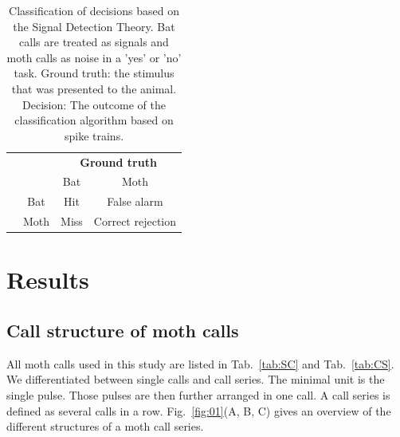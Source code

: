 \documentclass[12pt,a4paper,pdftex]{article}
\begin{document}
\begin{table}[h]
	\centering
	\caption{Classification of decisions based on the Signal Detection Theory. Bat calls are treated as signals and moth calls as noise in a 'yes' or 'no' task. Ground truth: the stimulus that was presented to the animal. Decision: The outcome of the classification algorithm based on spike trains.}
	\setlength{\tabcolsep}{10pt} %
	\renewcommand{\arraystretch}{1.5} %
	\label{tab:yesno}
	\begin{tabular}{llcc}
		&                                                   & \multicolumn{2}{c}{\cellcolor[HTML]{C0C0C0}\textbf{Ground truth}} \\
		&                                                   & \cellcolor[HTML]{C0C0C0}Bat     & \cellcolor[HTML]{C0C0C0}Moth    \\ \cline{3-4} 
		\multicolumn{1}{c}{\cellcolor[HTML]{C0C0C0}{\color[HTML]{000000} }}                                    & \multicolumn{1}{c|}{\cellcolor[HTML]{C0C0C0}Bat}  & Hit                             & False alarm                     \\
		\multicolumn{1}{c}{\multirow{-2}{*}{\cellcolor[HTML]{C0C0C0}{\color[HTML]{000000} \textbf{Decision}}}} & \multicolumn{1}{c|}{\cellcolor[HTML]{C0C0C0}Moth} & Miss                            & Correct rejection              
	\end{tabular}
\end{table}
\FloatBarrier

\newpage
\section*{Results}
\subsection*{Call structure of moth calls}
All moth calls used in this study are listed in Tab.~\ref{tab:SC} and Tab.~\ref{tab:CS}. We differentiated between single calls and call series. The minimal unit is the single pulse. Those pulses are then further arranged in one call. A call series is defined as several calls in a row. Fig.~\ref{fig:01}(A, B, C) gives an overview of the different structures of a moth call series.
\end{document}
